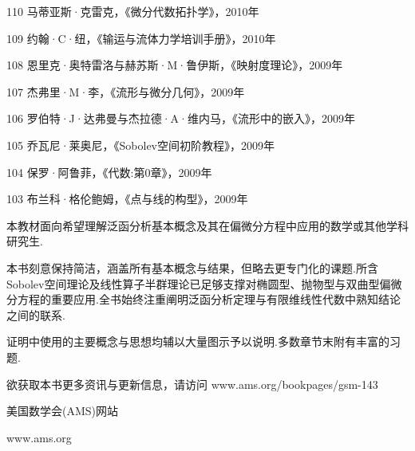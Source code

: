 \documentclass[10pt,b5paper,openany,twoside]{ctexbook}
\begin{document}
110 马蒂亚斯·克雷克，《微分代数拓扑学》，2010年

109 约翰·C·纽，《输运与流体力学培训手册》，2010年

108 恩里克·奥特雷洛与赫苏斯·M·鲁伊斯，《映射度理论》，2009年

107 杰弗里·M·李，《流形与微分几何》，2009年

106 罗伯特·J·达弗曼与杰拉德·A·维内马，《流形中的嵌入》，2009年

105 乔瓦尼·莱奥尼，《Sobolev空间初阶教程》，2009年

104 保罗·阿鲁菲，《代数:第0章》，2009年

103 布兰科·格伦鲍姆，《点与线的构型》，2009年

本教材面向希望理解泛函分析基本概念及其在偏微分方程中应用的数学或其他学科研究生.

本书刻意保持简洁，涵盖所有基本概念与结果，但略去更专门化的课题.所含Sobolev空间理论及线性算子半群理论已足够支撑对椭圆型、抛物型与双曲型偏微分方程的重要应用.全书始终注重阐明泛函分析定理与有限维线性代数中熟知结论之间的联系.

证明中使用的主要概念与思想均辅以大量图示予以说明.多数章节末附有丰富的习题.

欲获取本书更多资讯与更新信息，请访问 www.ams.org/bookpages/gsm-143

美国数学会(AMS)网站

www.ams.org
\end{document}
